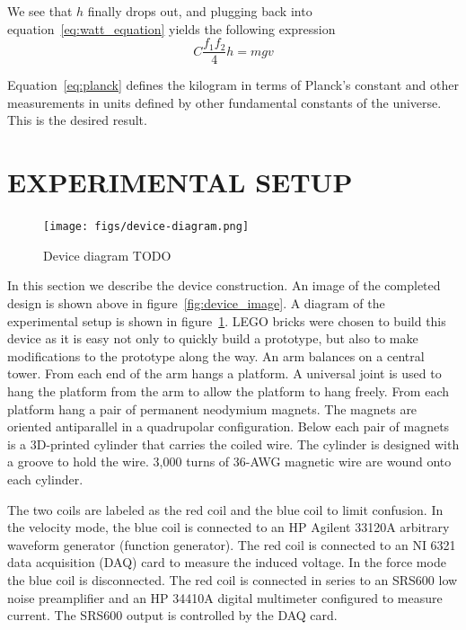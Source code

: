 \documentclass[aps,prstab,reprint,12pt]{revtex4-1}
\begin{document}
We see that $h$ finally drops out, and plugging back into equation~\ref{eq:watt_equation} yields the following expression
\begin{equation}\label{eq:planck}
    C \frac{f_1f_2}{4} h = mgv
\end{equation}

Equation~\ref{eq:planck} defines the kilogram in terms of Planck's constant and other measurements in units defined by other fundamental constants of the universe. This is the desired result.




\section{EXPERIMENTAL SETUP} \label{s:device} %

\begin{figure}[t]
    \centering
    \texttt{[image: figs/device-diagram.png]}
    \caption{Device diagram TODO}
    \label{fig:device_diagram}
\end{figure}


In this section we describe the device construction. An image of the completed design is shown above in figure~\ref{fig:device_image}. A diagram of the experimental setup is shown in figure~\ref{fig:device_diagram}.
LEGO bricks were chosen to build this device as it is easy not only to quickly build a prototype, but also to make modifications to the prototype along the way. An arm balances on a central tower.
From each end of the arm hangs a platform. A universal joint is used to hang the platform from the arm to allow the platform to hang freely. From each platform hang a pair of permanent neodymium magnets.
The magnets are oriented antiparallel in a quadrupolar configuration. Below each pair of magnets is a 3D-printed cylinder that carries the coiled wire.
The cylinder is designed with a groove to hold the wire. 3,000 turns of 36-AWG magnetic wire are wound onto each cylinder.

The two coils are labeled as the red coil and the blue coil to limit confusion. In the velocity mode, the blue coil is connected to an HP Agilent 33120A arbitrary waveform generator (function generator). The red coil is connected to an NI 6321 data acquisition (DAQ) card to measure the induced voltage. In the force mode the blue coil is disconnected. The red coil is connected in series to an SRS600 low noise preamplifier and an HP 34410A digital multimeter configured to measure current. The SRS600 output is controlled by the DAQ card.
\end{document}
